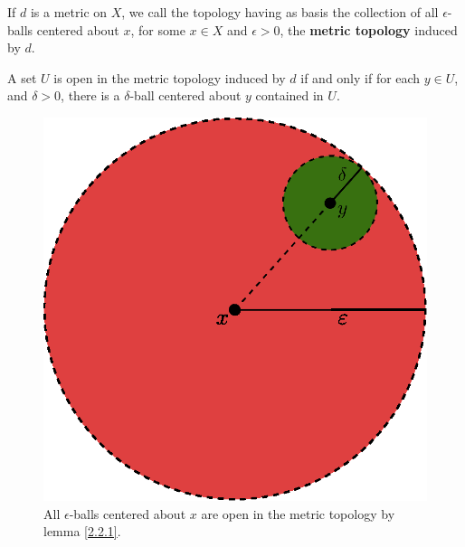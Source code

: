 \begin{definition}
    If $d$ is a metric on  $X$, we call the topology having as basis the
    collection of all $\epsilon$-balls centered about  $x$, for some  $x \in X$
    and $\epsilon>0$, the \textbf {metric topology} induced by $d$.
\end{definition}

\begin{corollary}
    A set $U$ is open in the metric topology induced by  $d$ if and only if for each
    $y \in U$, and $\delta>0$, there is a  $\delta$-ball centered about $y$
    contained in  $U$.
\end{corollary}

\begin{figure}[h]
    \centering
    \includegraphics[scale = 0.5]{Figures/Chapter2/open_balls.eps}
    \caption{All $\epsilon$-balls centered about  $x$ are open in the metric topology by lemma
    \ref{2.2.1}.}
    \label{fig2.1}
\end{figure}

